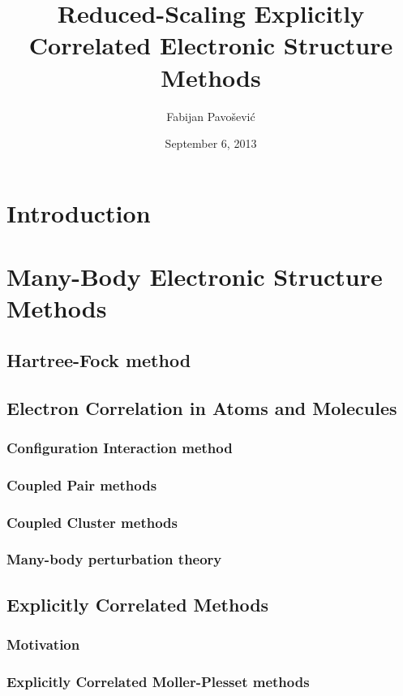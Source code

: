 \documentclass[journal=jacsat]{achemso}
\author{Fabijan Pavo\v{s}evi\'{c}}
\affiliation[Virginia Tech]
       {Department of Chemistry, Virginia Tech, Blacksburg, VA}
\title{Reduced-Scaling Explicitly Correlated Electronic Structure Methods}
\date{September 6, 2013}
\numberwithin{equation}{section}
\begin{document}
\maketitle
\newpage
\tableofcontents
\section{Introduction}


\section{Many-Body Electronic Structure Methods}

   
\subsection{Hartree-Fock method}

\subsection{Electron Correlation in Atoms and Molecules}

\subsubsection{Configuration Interaction method}

\subsubsection{Coupled Pair methods} 

\subsubsection{Coupled Cluster methods}
\subsubsection{Many-body perturbation theory}
 
\subsection{Explicitly Correlated Methods}
\subsubsection{Motivation}

\subsubsection{Explicitly Correlated Moller-Plesset methods}
  
\end{document}
